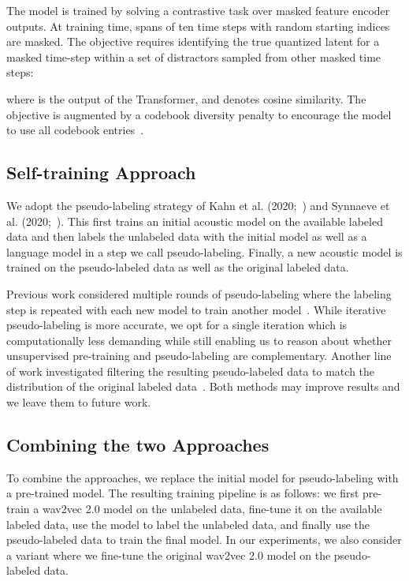 \documentclass{article}
\begin{document}
The model is trained by solving a contrastive task over masked feature encoder outputs.
At training time, spans of ten time steps with random starting indices are masked.
The objective requires identifying the true quantized latent  for a masked time-step within a set of  distractors  sampled from other masked time steps: 

where  is the output of the Transformer, and  denotes cosine similarity.
The objective is augmented by a codebook diversity penalty to encourage the model to use all codebook entries~\cite{dieleman2018challenge}.


\subsection{Self-training Approach}
\label{ssec:subhead}

We adopt the pseudo-labeling strategy of Kahn et al. (2020;~\cite{kahn2020st})  and Synnaeve et al. (2020;~\cite{synnaeve2019end}). 
This first trains an initial acoustic model on the available labeled data and then labels the unlabeled data with the initial model as well as a language model in a step we call pseudo-labeling.
Finally, a new acoustic model is trained on the pseudo-labeled data as well as the original labeled data.

Previous work considered multiple rounds of pseudo-labeling where the labeling step is repeated with each new model to train another model~\cite{xu2020iterative}.
While iterative pseudo-labeling is more accurate, we opt for a single iteration which is computationally less demanding while still enabling us to reason about whether unsupervised pre-training and pseudo-labeling are complementary. 
Another line of work investigated filtering the resulting pseudo-labeled data to match the distribution of the original labeled data~\cite{park2020improved}.
Both methods may improve results and we leave them to future work.


\subsection{Combining the two Approaches}

To combine the approaches, we replace the initial model for pseudo-labeling with a pre-trained model.
The resulting training pipeline is as follows:
we first pre-train a wav2vec 2.0 model on the unlabeled data, fine-tune it on the available labeled data, use the model to label the unlabeled data, and finally use the pseudo-labeled data to train the final model.
In our experiments, we also consider a variant where we fine-tune the original wav2vec 2.0 model on the pseudo-labeled data. 
\end{document}
